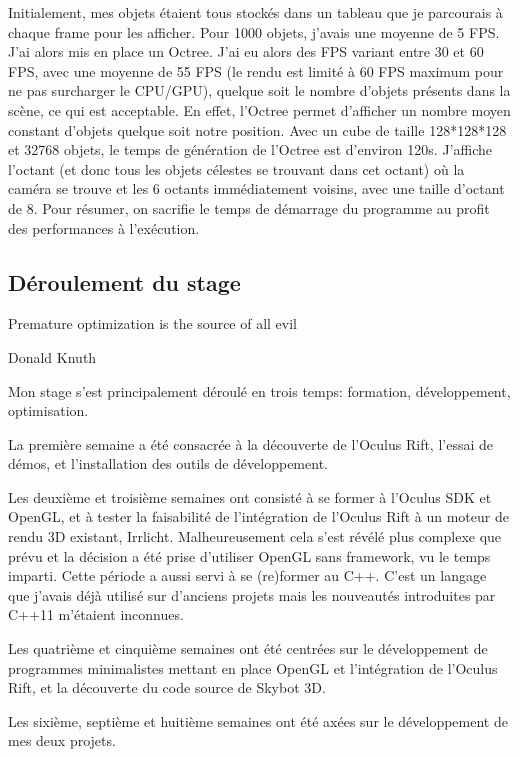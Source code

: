 \documentclass[a4paper,french,12pt]{article}
\begin{document}
		
		Initialement, mes objets étaient tous stockés dans un tableau que je parcourais à chaque frame pour les afficher.
		Pour 1000 objets, j'avais une moyenne de 5 FPS. 
		J'ai alors mis en place un Octree. J'ai eu alors des FPS variant entre 30 et 60 FPS, avec une moyenne de 55 FPS
		(le rendu est limité à 60 FPS maximum
		pour ne pas surcharger le CPU/GPU), quelque soit le nombre d'objets présents dans la scène, ce qui est acceptable.
		En effet, l'Octree permet d'afficher un nombre moyen constant d'objets quelque soit notre position.
		Avec un cube de taille 128*128*128 et 32768 objets, le temps de génération de l'Octree est d'environ 120s.
		J'affiche l'octant (et donc tous les objets célestes se trouvant dans cet octant) où la caméra se trouve
		et les 6 octants immédiatement voisins, avec une taille d'octant de 8.
		Pour résumer, on sacrifie le temps de démarrage du programme au profit des performances à l'exécution.


	
		
	\subsection{Déroulement du stage}
	
	   \epigraph{Premature optimization is the source of all evil}{Donald Knuth}
	   
		Mon stage s'est principalement déroulé en trois temps: formation, développement, optimisation.
		
		La première semaine a été consacrée à la découverte de l'Oculus Rift, l'essai de démos, et l'installation
		des outils de développement.
		
		Les deuxième et troisième semaines ont consisté à se former à l'Oculus SDK et OpenGL, et à tester la
		faisabilité de l'intégration de l'Oculus Rift à un moteur de rendu 3D existant, Irrlicht. Malheureusement 
		cela s'est révélé plus complexe que prévu et la décision a été prise d'utiliser OpenGL sans framework,
		vu le temps imparti.
		Cette période a aussi servi à se (re)former au C++. C'est un langage que j'avais déjà utilisé sur d'anciens
		projets mais les nouveautés introduites par C++11 m'étaient inconnues.
		
		Les quatrième et cinquième semaines ont été centrées sur le développement de programmes minimalistes mettant
		en place OpenGL et l'intégration de l'Oculus Rift, et la découverte du code source de Skybot 3D.
		
		Les sixième, septième et huitième semaines ont été axées sur le développement de mes deux projets.
		
\end{document}
